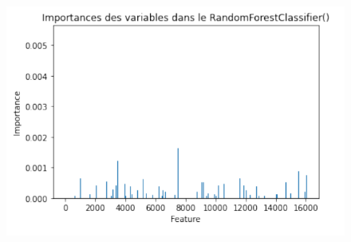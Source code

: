 \documentclass{beamer}
\theoremstyle{definition}
\begin{document}
\begin{frame}
\begin{minipage}[t]{1\linewidth}
\begin{minipage}[t]{0.49\linewidth}
\begin{figure}
\begin{center}
					\includegraphics[width=1\linewidth]{11.png}
				\end{center}
				
		\end{figure}\end{minipage}
	\end{minipage}	
\end{frame}
\end{document}
